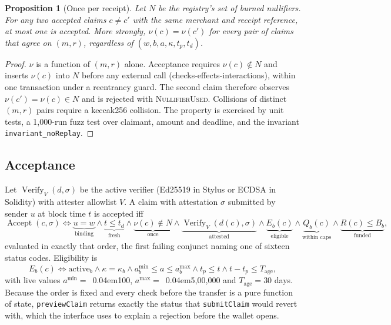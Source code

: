 \documentclass[10.5pt,letterpaper]{article}
\newcommand{\inr}{{\scalebox{0.82}{\faRupeeSign}}\kern0.04em}
\newtheorem{proposition}{Proposition}
\theoremstyle{definition}
\theoremstyle{remark}
\newcommand{\ttt}[1]{\texttt{#1}}
\DeclareMathOperator{\Accept}{Accept}
\DeclareMathOperator{\Verify}{Verify}
\begin{document}
\begin{proposition}[Once per receipt]\label{prop:replay}
Let $N$ be the registry's set of burned nullifiers. For any two accepted claims $c\neq c'$ with the same merchant and
receipt reference, at most one is accepted. More strongly, $\nu(c)=\nu(c')$ for every pair of claims that agree on $(m,r)$,
regardless of $(w,b,a,\kappa,t_p,t_d)$.
\end{proposition}
\begin{proof}
$\nu$ is a function of $(m,r)$ alone. Acceptance requires $\nu(c)\notin N$ and inserts $\nu(c)$ into $N$ before any
external call (checks-effects-interactions), within one transaction under a reentrancy guard. The second claim
therefore observes $\nu(c')=\nu(c)\in N$ and is rejected with \textsc{NullifierUsed}. Collisions of distinct $(m,r)$
pairs require a keccak256 collision. The property is exercised by unit tests, a 1{,}000-run fuzz test over claimant, amount and deadline, and the
invariant \ttt{invariant\_noReplay}.
\end{proof}

\subsection{Acceptance}
Let $\Verify_V(d,\sigma)$ be the active verifier (Ed25519 in Stylus or ECDSA in Solidity) with attester allowlist $V$.
A claim with attestation $\sigma$ submitted by sender $u$ at block time $t$ is accepted iff
\begin{equation}\label{eq:accept}
\Accept(c,\sigma) \iff
\underbrace{u=w}_{\text{binding}} \wedge
\underbrace{t\le t_d}_{\text{fresh}} \wedge
\underbrace{\nu(c)\notin N}_{\text{once}} \wedge
\underbrace{\Verify_V(d(c),\sigma)}_{\text{attested}} \wedge
\underbrace{E_b(c)}_{\text{eligible}} \wedge
\underbrace{Q_b(c)}_{\text{within caps}} \wedge
\underbrace{R(c)\le B_b}_{\text{funded}},
\end{equation}
evaluated in exactly that order, the first failing conjunct naming one of sixteen status codes. Eligibility is
\begin{equation}
E_b(c) \iff \mathrm{active}_b \wedge \kappa=\kappa_b \wedge a_b^{\min}\le a\le a_b^{\max} \wedge t_p\le t \wedge t-t_p\le T_{\mathrm{age}},
\end{equation}
with live values $a^{\min}=$~\inr 100, $a^{\max}=$~\inr 5{,}00{,}000 and $T_{\mathrm{age}}=30$ days. Because the order is fixed and
every check before the transfer is a pure function of state, \ttt{previewClaim} returns exactly the status that
\ttt{submitClaim} would revert with, which the interface uses to explain a rejection before the wallet opens.
\end{document}
